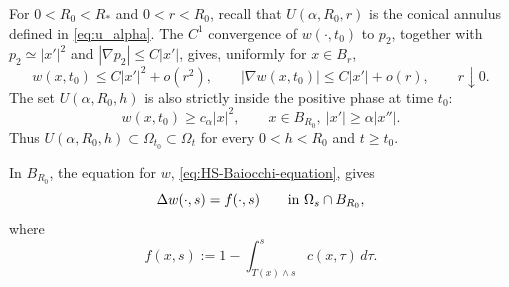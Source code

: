 \documentclass[11pt]{amsart}
\numberwithin{equation}{section}
\numberwithin{figure}{section}
\theoremstyle{plain}
\theoremstyle{definition}
\theoremstyle{remark}
\theoremstyle{plain}
\begin{document}
For \(0<R_0<R_*\) and \(0<r<R_0\), recall that \(U(\alpha,R_0,r)\) is the conical annulus
defined in \eqref{eq:u_alpha}.
The \(C^1\) convergence of \(w(\cdot,t_0)\) to \(p_2\), together
with \(p_2\simeq |x'|^2\) and \(|\nabla p_2|\leq C|x'|\), gives, uniformly
for \(x\in B_r\),
\begin{equation}\label{eq:cone_w0_bounds}
    w(x,t_0)\leq C|x'|^2+o(r^2),
    \qquad
    |\nabla w(x,t_0)|\leq C|x'|+o(r),
    \qquad r\downarrow0.
\end{equation}
The set \(U(\alpha,R_0,h)\) is also strictly
inside the positive phase at time \(t_0\):
\begin{equation}\label{eq:cone_Ur_positive_at_t0}
    w(x,t_0)\geq c_\alpha |x|^2,
    \qquad x\in B_{R_0},\ |x'|\geq \alpha |x''|.
\end{equation}
Thus \(U(\alpha,R_0,h)\subset \Omega_{t_0}\subset\Omega_t\) for every
\(0<h<R_0\) and \(t\geq t_0\).



In \(B_{R_0}\), the equation for \(w\), \eqref{eq:HS-Baiocchi-equation}, gives
\[
    \Delta w(\cdot,s)=f(\cdot,s)
    \qquad\hbox{in }\Omega_s\cap B_{R_0},
\]
where
\begin{equation}\label{eq:cone_f_definition}
    f(x,s):=1-\int_{T(x)\wedge s}^s c(x,\tau)\,d\tau .
\end{equation}
\end{document}
